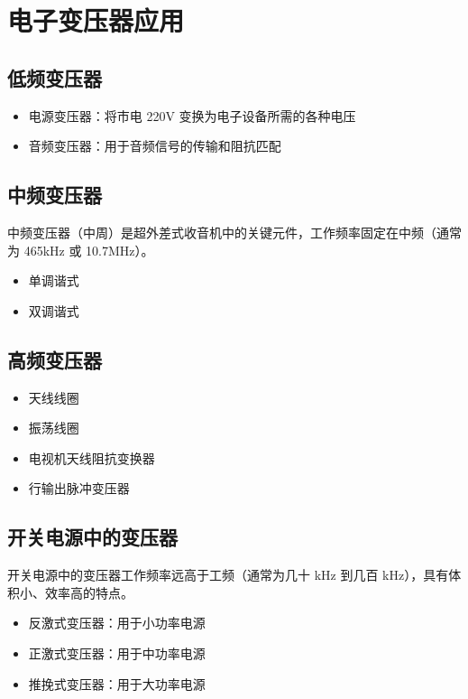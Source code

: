 \documentclass[12pt,UTF8]{ctexbook}
\begin{document}
\chapter{电子变压器应用}
\label{chap:electronic_apps}

\section{低频变压器}

\begin{itemize}
    \item 电源变压器：将市电 220V 变换为电子设备所需的各种电压
    \item 音频变压器：用于音频信号的传输和阻抗匹配
\end{itemize}

\section{中频变压器}

中频变压器（中周）是超外差式收音机中的关键元件，工作频率固定在中频（通常为 465kHz 或 10.7MHz）。

\begin{itemize}
    \item 单调谐式
    \item 双调谐式
\end{itemize}

\section{高频变压器}

\begin{itemize}
    \item 天线线圈
    \item 振荡线圈
    \item 电视机天线阻抗变换器
    \item 行输出脉冲变压器
\end{itemize}

\section{开关电源中的变压器}

开关电源中的变压器工作频率远高于工频（通常为几十 kHz 到几百 kHz），具有体积小、效率高的特点。

\begin{itemize}
    \item 反激式变压器：用于小功率电源
    \item 正激式变压器：用于中功率电源
    \item 推挽式变压器：用于大功率电源
\end{itemize}
\end{document}
